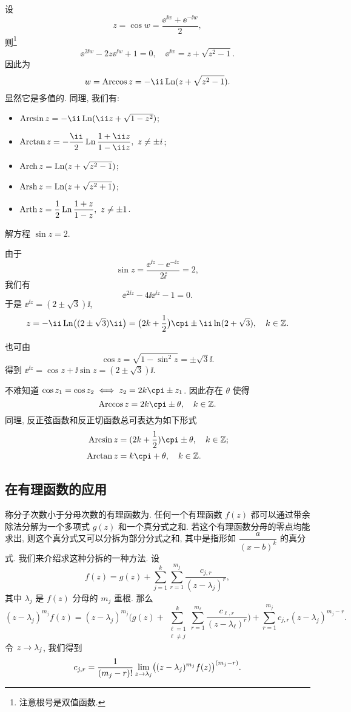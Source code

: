 设
\[
  z=\cos w=\frac{\ee^{\ii w}+\ee^{-\ii w}}2,\]
则\footnote{注意根号是双值函数.}
\[
  \ee^{2\ii w}-2z\ee^{\ii w}+1=0,\quad
  \ee^{\ii w}=z+\sqrt{z^2-1}.
\]
因此为
\[
  w=\Arccos z=-\ii \Ln(z+\sqrt{z^2-1}).
\]
显然它是多值的. 同理, 我们有:

\begin{itemize}[addsep]
  \item {} $\Arcsin z=-\ii\Ln(\ii z+\sqrt{1-z^2})$;
  \item {} $\Arctan z=-\dfrac \ii 2\Ln\dfrac{1+\ii z}{1-\ii z},\ z\neq \pm i$;
  \item {} $\operatorname{Arch} z=\operatorname{Ln}(z+\sqrt{z^2-1})$;
  \item {} $\operatorname{Arsh} z=\operatorname{Ln}(z+\sqrt{z^2+1})$;
  \item {} $\Arth z=\dfrac12\Ln\dfrac{1+z}{1-z},\ z\neq \pm1$.
\end{itemize}

\begin{example}
  解方程 $\sin z=2$.
\end{example}

\begin{solution}
  由于
  \[
    \sin z=\frac{\ee^{\ii z}-\ee^{-\ii z}}{2\ii}=2,
  \]
  我们有
  \[
    \ee^{2\ii z}-4\ii\ee^{\ii z}-1=0.
  \]
  于是 $\ee^{\ii z}=(2\pm\sqrt 3)\ii$,
  \[
     z
    =-\ii\Ln\bigl((2\pm\sqrt 3)\ii\bigr)
    =\bigl(2k+\half\bigr)\cpi\pm \ii\ln(2+\sqrt3),
      \quad k\in\BZ.
  \]
\end{solution}

也可由
\[
  \cos z=\sqrt{1-\sin^2 z}=\pm\sqrt 3\ii.
\]
得到 $\ee^{\ii z}=\cos z+\ii\sin z=(2\pm\sqrt 3)\ii$.

不难知道 $\cos z_1=\cos z_2\iff z_2=2k\cpi\pm z_1$.
因此存在 $\theta$ 使得
\[
  \Arccos z=2k\cpi\pm \theta,\quad k\in\BZ.
\]
同理, 反正弦函数和反正切函数总可表达为如下形式
\begin{align*}
  \Arcsin z&=(2k+\half)\cpi\pm \theta,\quad k\in\BZ;\\
  \Arctan z&=k\cpi+\theta,\quad k\in\BZ.
\end{align*}


\subsection{在有理函数的应用}
\label{ssec:application-of-derivative}

称分子次数小于分母次数的有理函数为.
任何一个有理函数 $f(z)$ 都可以通过带余除法分解为一个多项式 $g(z)$ 和一个真分式之和.
若这个有理函数分母的零点均能求出, 则这个真分式又可以分拆为部分分式之和, 其中是指形如 $\dfrac{a}{(x-b)^k}$ 的真分式.
我们来介绍求这种分拆的一种方法.
设
\[
  f(z)=g(z)+\sum_{j=1}^k \sum_{r=1}^{m_j} \frac{c_{j,r}}{(z-\lambda_j)^r},
\]
其中 $\lambda_j$ 是 $f(z)$ 分母的 $m_j$ 重根.
那么
\[
   (z-\lambda_j)^{m_j}f(z)
  =(z-\lambda_j)^{m_j}\biggl(g(z)+\sum_{\substack{\ell=1\\\ell\neq j}}^k \sum_{r=1}^{m_\ell} \frac{c_{\ell,r}}{(z-\lambda_\ell)^r}\biggr)
    +\sum_{r=1}^{m_j} c_{j,r}(z-\lambda_j)^{m_j-r}.
\]
令 $z\rightarrow \lambda_j$, 我们得到
\[
  c_{j,r}=\frac1{(m_j-r)!}\lim_{z\rightarrow \lambda_j}
  \bigl((z-\lambda_j)^{m_j}f(z)\bigr)^{(m_j-r)}.
\]

